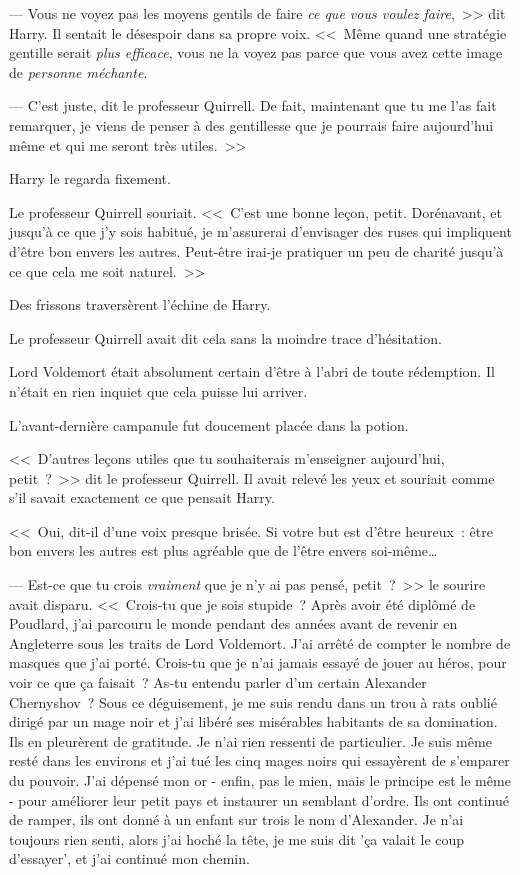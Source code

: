 --- Vous ne voyez pas les moyens gentils de faire \emph{ce que vous voulez faire},~>> dit Harry. Il sentait le désespoir dans sa propre voix. <<~Même quand une stratégie gentille serait \emph{plus efficace}, vous ne la voyez pas parce que vous avez cette image de \emph{personne méchante}.

--- C'est juste, dit le professeur Quirrell. De fait, maintenant que tu me l'as fait remarquer, je viens de penser à des gentillesse que je pourrais faire aujourd'hui même et qui me seront très utiles.~>>

Harry le regarda fixement.

Le professeur Quirrell souriait. <<~C'est une bonne leçon, petit. Dorénavant, et jusqu'à ce que j'y sois habitué, je m'assurerai d'envisager des ruses qui impliquent d'être bon envers les autres. Peut-être irai-je pratiquer un peu de charité jusqu'à ce que cela me soit naturel.~>>

Des frissons traversèrent l'échine de Harry.

Le professeur Quirrell avait dit cela sans la moindre trace d'hésitation.

Lord Voldemort était absolument certain d'être à l'abri de toute rédemption. Il n'était en rien inquiet que cela puisse lui arriver.

L'avant-dernière campanule fut doucement placée dans la potion.

<<~D'autres leçons utiles que tu souhaiterais m'enseigner aujourd'hui, petit~?~>> dit le professeur Quirrell. Il avait relevé les yeux et souriait comme s'il savait exactement ce que pensait Harry.

<<~Oui, dit-il d'une voix presque brisée. Si votre but est d'être heureux~: être bon envers les autres est plus agréable que de l'être envers soi-même…

--- Est-ce que tu crois \emph{vraiment} que je n'y ai pas pensé, petit~?~>> le sourire avait disparu. <<~Crois-tu que je sois stupide~? Après avoir été diplômé de Poudlard, j'ai parcouru le monde pendant des années avant de revenir en Angleterre sous les traits de Lord Voldemort. J'ai arrêté de compter le nombre de masques que j'ai porté. Crois-tu que je n'ai jamais essayé de jouer au héros, pour voir ce que ça faisait~? As-tu entendu parler d'un certain Alexander Chernyshov~? Sous ce déguisement, je me suis rendu dans un trou à rats oublié dirigé par un mage noir et j'ai libéré ses misérables habitants de sa domination. Ils en pleurèrent de gratitude. Je n'ai rien ressenti de particulier. Je suis même resté dans les environs et j'ai tué les cinq mages noirs qui essayèrent de s'emparer du pouvoir. J'ai dépensé mon or - enfin, pas le mien, mais le principe est le même - pour améliorer leur petit pays et instaurer un semblant d'ordre. Ils ont continué de ramper, ils ont donné à un enfant sur trois le nom d'Alexander. Je n'ai toujours rien senti, alors j'ai hoché la tête, je me suis dit 'ça valait le coup d'essayer', et j'ai continué mon chemin.

